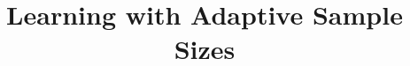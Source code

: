 \documentclass{article}
\author{}
\begin{document}
\title{Learning with Adaptive Sample Sizes}

\date{} 

\maketitle











\end{document}
